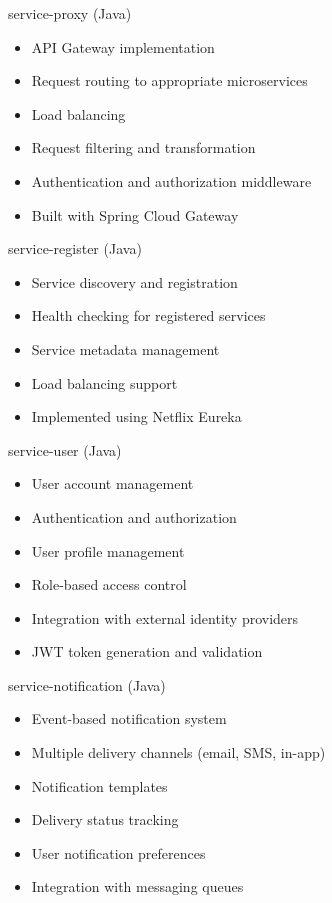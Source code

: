 \documentclass{beamer}
\begin{document}
\begin{frame}{service-proxy (Java)}
  \begin{itemize}
    \item API Gateway implementation
    \item Request routing to appropriate microservices
    \item Load balancing
    \item Request filtering and transformation
    \item Authentication and authorization middleware
    \item Built with Spring Cloud Gateway
  \end{itemize}
\end{frame}

\begin{frame}{service-register (Java)}
  \begin{itemize}
    \item Service discovery and registration
    \item Health checking for registered services
    \item Service metadata management
    \item Load balancing support
    \item Implemented using Netflix Eureka
  \end{itemize}
\end{frame}

\begin{frame}{service-user (Java)}
  \begin{itemize}
    \item User account management
    \item Authentication and authorization
    \item User profile management
    \item Role-based access control
    \item Integration with external identity providers
    \item JWT token generation and validation
  \end{itemize}
\end{frame}

\begin{frame}{service-notification (Java)}
  \begin{itemize}
    \item Event-based notification system
    \item Multiple delivery channels (email, SMS, in-app)
    \item Notification templates
    \item Delivery status tracking
    \item User notification preferences
    \item Integration with messaging queues
  \end{itemize}
\end{frame}
\end{document}
